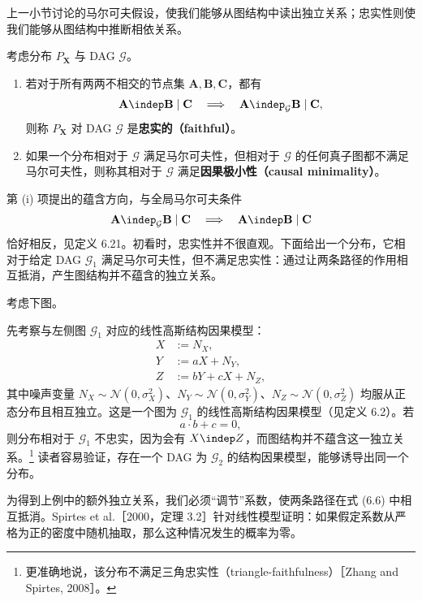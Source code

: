 上一小节讨论的马尔可夫假设，使我们能够从图结构中读出独立关系；忠实性则使我们能够从图结构中推断相依关系。

\begin{definition}[忠实性与因果极小性]
考虑分布 $P_{\mathbf X}$ 与 DAG $\mathcal G$。
\begin{enumerate}[label=(\roman*)]
 \item 若对于所有两两不相交的节点集 $\mathbf A,\mathbf B,\mathbf C$，都有
 \[
 \mathbf A\indep\mathbf B\mid\mathbf C
 \quad\Longrightarrow\quad
 \mathbf A\indep_{\mathcal G}\mathbf B\mid\mathbf C,
 \]
 则称 $P_{\mathbf X}$ 对 DAG $\mathcal G$ 是\textbf{忠实的（faithful）}。
 \item 如果一个分布相对于 $\mathcal G$ 满足马尔可夫性，但相对于 $\mathcal G$ 的任何真子图都不满足马尔可夫性，则称其相对于 $\mathcal G$ 满足\textbf{因果极小性（causal minimality）}。
\end{enumerate}
\end{definition}

第 (i) 项提出的蕴含方向，与全局马尔可夫条件
\[
 \mathbf A\indep_{\mathcal G}\mathbf B\mid\mathbf C
 \quad\Longrightarrow\quad
 \mathbf A\indep\mathbf B\mid\mathbf C
\]
恰好相反，见定义 6.21。初看时，忠实性并不很直观。下面给出一个分布，它相对于给定 DAG $\mathcal G_1$ 满足马尔可夫性，但不满足忠实性：通过让两条路径的作用相互抵消，产生图结构并不蕴含的独立关系。

\begin{example}[违反忠实性]
考虑下图。

先考察与左侧图 $\mathcal G_1$ 对应的线性高斯结构因果模型：
\[
 \begin{aligned}
 X&:=N_X,\\
 Y&:=aX+N_Y,\\
 Z&:=bY+cX+N_Z,
 \end{aligned}
\]
其中噪声变量 $N_X\sim\mathcal N(0,\sigma_X^2)$、$N_Y\sim\mathcal N(0,\sigma_Y^2)$、$N_Z\sim\mathcal N(0,\sigma_Z^2)$ 均服从正态分布且相互独立。这是一个图为 $\mathcal G_1$ 的线性高斯结构因果模型（见定义 6.2）。若
\begin{equation}
 a\cdot b+c=0,
 \tag{6.6}
\end{equation}
则分布相对于 $\mathcal G_1$ 不忠实，因为会有 $X\indep Z$，而图结构并不蕴含这一独立关系。\footnote{更准确地说，该分布不满足三角忠实性（triangle-faithfulness）［Zhang and Spirtes, 2008］。}
读者容易验证，存在一个 DAG 为 $\mathcal G_2$ 的结构因果模型，能够诱导出同一个分布。
\end{example}

为得到上例中的额外独立关系，我们必须“调节”系数，使两条路径在式 (6.6) 中相互抵消。Spirtes et al.［2000，定理 3.2］针对线性模型证明：如果假定系数从严格为正的密度中随机抽取，那么这种情况发生的概率为零。

